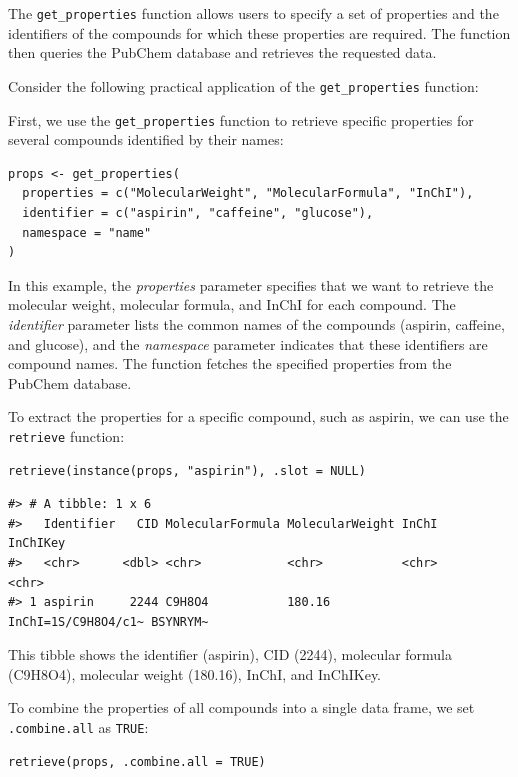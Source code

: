 The \texttt{get\_properties} function allows users to specify a set of properties and the identifiers of the compounds for which these properties are required. The function then queries the PubChem database and retrieves the requested data.

Consider the following practical application of the \texttt{get\_properties} function:

First, we use the \texttt{get\_properties} function to retrieve specific properties for several compounds identified by their names:

\begin{verbatim}
props <- get_properties(
  properties = c("MolecularWeight", "MolecularFormula", "InChI"),
  identifier = c("aspirin", "caffeine", "glucose"),
  namespace = "name"
)
\end{verbatim}

In this example, the \emph{properties} parameter specifies that we want to retrieve the molecular weight, molecular formula, and InChI for each compound. The \emph{identifier} parameter lists the common names of the compounds (aspirin, caffeine, and glucose), and the \emph{namespace} parameter indicates that these identifiers are compound names. The function fetches the specified properties from the PubChem database.

To extract the properties for a specific compound, such as aspirin, we can use the \texttt{retrieve} function:

\begin{verbatim}
retrieve(instance(props, "aspirin"), .slot = NULL)
\end{verbatim}

\begin{verbatim}
#> # A tibble: 1 x 6
#>   Identifier   CID MolecularFormula MolecularWeight InChI               InChIKey
#>   <chr>      <dbl> <chr>            <chr>           <chr>               <chr>   
#> 1 aspirin     2244 C9H8O4           180.16          InChI=1S/C9H8O4/c1~ BSYNRYM~
\end{verbatim}

This tibble shows the identifier (aspirin), CID (2244), molecular formula (C9H8O4), molecular weight (180.16), InChI, and InChIKey.

To combine the properties of all compounds into a single data frame, we set \texttt{.combine.all} as \texttt{TRUE}:

\begin{verbatim}
retrieve(props, .combine.all = TRUE)
\end{verbatim}


